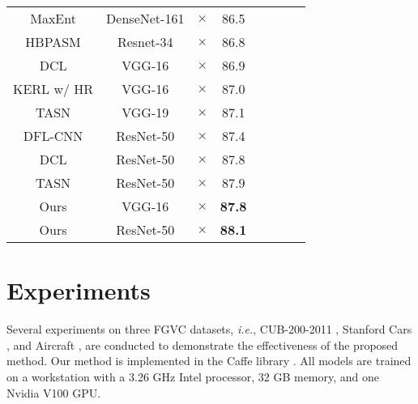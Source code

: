 \documentclass[10pt,twocolumn,letterpaper]{article}
\def\ie{{\em i.e.}}
\begin{document}
\begin{table}[t]
{\begin{tabular}{ccccpppp}
    	   MaxEnt \cite{DBLP:conf/nips/DubeyGRN18}    & DenseNet-161 &  $\times$  &      86.5       \\
    	            HBPASM \cite{8805063}             &  Resnet-34   &  $\times$  &      86.8       \\
    	          DCL \cite{Chen_2019_CVPR}           &    VGG-16    &  $\times$  &      86.9       \\
    	KERL w/ HR \cite{DBLP:conf/ijcai/ChenLCWL18}  &    VGG-16    &  $\times$  &      87.0       \\
    	TASN \cite{DBLP:journals/corr/abs-1903-06150} &    VGG-19    &  $\times$  &      87.1       \\
    	   DFL-CNN \cite{DBLP:conf/cvpr/WangMD18}     &  ResNet-50   &  $\times$  &      87.4       \\
    	          DCL \cite{Chen_2019_CVPR}           &  ResNet-50   &  $\times$  &      87.8       \\
    	TASN \cite{DBLP:journals/corr/abs-1903-06150} &  ResNet-50   &  $\times$  &      87.9       \\
    	                    Ours                      &    VGG-16    &  $\times$  &  \textbf{87.8}  \\
    	                    Ours                      &  ResNet-50   &  $\times$  &  \textbf{88.1}  \\ \bottomrule
    \end{tabular}}
    \vspace{-2mm}
\end{table}

\section{Experiments}
Several experiments on three FGVC datasets, \ie, CUB-200-2011 \cite{report-wahcub_200_2011}, Stanford Cars \cite{DBLP:conf/iccvw/Krause0DF13}, and Aircraft \cite{maji13fine-grained}, are conducted to demonstrate the effectiveness of the proposed method. Our method is implemented in the Caffe library \cite{DBLP:journals/corr/JiaSDKLGGD14}. All models are trained on a workstation with a 3.26 GHz Intel processor, 32 GB memory, and one Nvidia V100 GPU.
\end{document}

